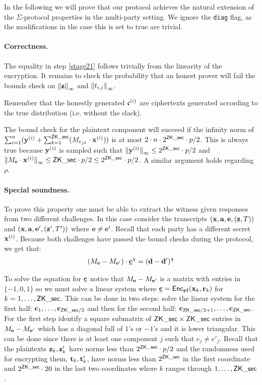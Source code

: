 In the following we will prove that our protocol achieves the natural
extension of the $\Sigma$-protocol properties in the multi-party
setting.
We ignore the \verb+diag+ flag, as the modifications in the case
this is set to true are trivial.

\paragraph{Correctness.}
The equality in step \ref{stage21} follows trivially from the linearity of the encryption.
It remains to check the probability that an honest prover will fail the bounds check on ${\Vert \mathbf{z} \Vert}_\infty$ 
and ${\Vert t_{i,j} \Vert}_\infty$.

Remember that the honestly generated $\mathfrak{c}^{(i)}$ are ciphertexts
generated according to the true distribution (i.e. without the slack).

The bound check for the plaintext component will succeed if the 
infinity norm of $\sum_{i=1}^n (\mathbf{y}^{(i)} + \sum_{k=1}^{\mathsf{ZK\_sec}}(M_{e_{jk}} \cdot
\mathbf{x}^{(i)}))$ is at most $2 \cdot n \cdot 2^{\mathsf{ZK\_sec}} \cdot p/2$. 
This is always true because $\mathbf{y}^{(i)}$ is sampled such that 
${\Vert \mathbf{y}^{(i)} \Vert}_\infty \leq 2^{\mathsf{ZK\_sec}} \cdot p/2$ and 
${\Vert M_{\mathbf{e}} \cdot \mathbf{x}^{(i)} \Vert}_\infty \le \mathsf{ZK\_sec} \cdot p/2 \le 2^{\mathsf{ZK\_sec}} \cdot p/2$. 
A similar argument holds regarding $\rho$.

\paragraph{Special soundness.} To prove this property one must be able to extract the witness given responses from 
two different challenges. 
In this case consider the transcripts $(\mathbf{x}, \mathbf{a}, \mathbf{e}, (\mathbf{z}, T))$ and $(\mathbf{x}, \mathbf{a}, \mathbf{e}', (\mathbf{z}', T'))$ where $\mathbf{e} \neq \mathbf{e}'$. 
Recall that each party has a different secret $\mathbf{x}^{(i)}$. 
Because both challenges have passed the bound checks during the protocol, we get that:
\begin{align*}
    (M_{\mathbf{e}} - M_{\mathbf{e}'}) \cdot \underline{\mathbf{c}}^{\intercal} = (\mathbf{d} - \mathbf{d}')^{\intercal}
\end{align*}

To solve the equation for $\underline{\mathbf{c}}$ notice that $M_{\mathbf{e}} - M_{\mathbf{e}'}$ is a matrix with entries in $\{-1,0,1\}$ so we 
must solve a linear system where $\underline{\mathbf{c}} = \mathsf{Enc}_{\mathfrak{pk}}(\mathbf{x}_k, \mathbf{r}_k)$ for $k = 1,\dots,\mathsf{ZK\_sec}$. 
This can be done in two steps: solve the linear system for the first half: $\mathbf{c}_1, \dots, \mathbf{c}_{\mathsf{ZK\_sec}/2}$ and 
then for the second half: $\mathbf{c}_{\mathsf{ZK\_sec}/2+1}, \dots, \mathbf{c}_{\mathsf{ZK\_sec}}$. 
For the first step identify a square submatrix of $\mathsf{ZK\_sec} \times \mathsf{ZK\_sec}$ entries in $M_{\mathbf{e}} - M_{\mathbf{e}'}$ which 
has a diagonal full of $1$'s or $-1$'s and it is lower triangular. 
This can be done since there is at least one component $j$ such that $e_j \neq e'_j$. 
Recall that the plaintexts $\mathbf{z}_k, \mathbf{z}'_k$ have norms less than $2^{\mathsf{ZK\_sec}} \cdot p/2$ and 
the randomness used for encrypting them, $\mathbf{t}_k, \mathbf{t}'_k$, have norms less than 
$2^{\mathsf{ZK\_sec}}$ in the first coordinate and $2^{\mathsf{ZK\_sec}} \cdot 20$ in the last two coordinates where $k$ ranges 
through $1, \dots, \mathsf{ZK\_sec}$.

